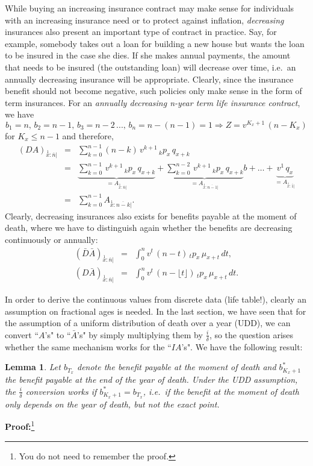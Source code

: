 \documentclass[11pt,fleqn,oneside]{book}
\newtheorem{lemma}{Lemma}[section]
\begin{document}
While buying an increasing insurance contract may make sense for individuals with an increasing insurance need or to protect against inflation, \textit{decreasing} insurances also present an important type of contract in practice. Say, for example, somebody takes out a loan for building a new house but wants the loan to be insured in the case she dies. If she makes annual payments, the amount that needs to be insured (the outstanding loan) will decrease over time, i.e.\ an annually decreasing insurance will be appropriate. Clearly, since the insurance benefit should not become negative, such policies only make sense in the form of term insurances. For an \textit{annually decreasing n-year term life insurance contract}, we have
$$
b_1=n,\,b_2=n-1,\,b_3=n-2\,...,\,b_n = n-(n-1) = 1 \Rightarrow Z = v^{K_x+1}\,(n-K_x)
$$
for $K_x\leq n-1$ and therefore,
\begin{eqnarray*}
{\left(DA\right)_{\stackrel{1}{x}:\overline{n}|}} &=& \sum_{k=0}^{n-1} (n-k)\,v^{k+1}\,{_kp_x}\,{q_{x+k}}\\
&=&  \underbrace{\sum_{k=0}^{n-1} \,v^{k+1}\,{_kp_x}\,{q_{x+k}}}_{={A_{\stackrel{1}{x}:\overline{n}|}}}+  \underbrace{\sum_{k=0}^{n-2} \,v^{k+1}\,{_kp_x}\,{q_{x+k}}}_{={A_{\stackrel{1}{x}:\overline{n-1}|}}}b +\ldots +  \underbrace{v^{1}\,{q_{x}}}_{={A_{\stackrel{1}{x}:\overline{1}|}}}\\
&=& \sum_{k=0}^{n-1} {A_{\stackrel{1}{x}:\overline{n-k}|}}.
\end{eqnarray*}
Clearly, decreasing insurances also exists for benefits payable at the moment of death, where we have to distinguish again whether the benefits are decreasing continuously or annually:
\begin{eqnarray*}
{\left(\bar{D}\bar{A}\right)_{\stackrel{1}{x}:\overline{n}|}} &=& \int_0^n v^t\, (n-t)\,{_tp_x}\,{\mu_{x+t}}\,dt,\\
{\left(D\bar{A}\right)_{\stackrel{1}{x}:\overline{n}|}} &=& \int_0^n v^t\,(n- \lfloor t \rfloor) \,{_tp_x}\,{\mu_{x+t}}\,dt.
\end{eqnarray*}

In order to derive the continuous values from discrete data (life table!), clearly an assumption on fractional ages is needed. In the last section, we have seen that for the assumption of  a uniform distribution of death over a year (UDD), we can convert ``$A$'s" to ``$\bar{A}$'s" by simply multiplying them by $\frac{i}{\delta}$, so the question arises whether the same mechanism works for the ``$IA$'s". We have the following result:
\begin{lemma}
\label{LEMMACONVBAR}
Let $b_{T_x}$ denote the benefit payable at the moment of death and $b^*_{K_x+1}$ the benefit payable at the end of the year of death. Under the UDD assumption, the $\frac{i}{\delta}$ conversion works if 
$b^*_{K_x+1}= b_{T_x}$, i.e.\ if the benefit at the moment of death only depends on the year of death, but not the exact point.
\end{lemma}
\noindent \textbf{Proof:}\footnote{You do not need to remember the proof.}
\end{document}
